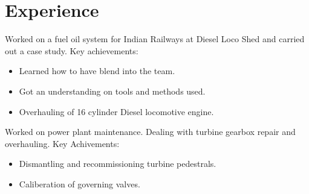 \section{Experience}

{Worked on a fuel oil system for Indian Railways at Diesel Loco Shed and carried out a case study.
\newline{}\newline{}
Key achievements:
\begin{itemize}
\item Learned how to have blend into the team.
\item Got an understanding on tools and methods used.
\item Overhauling of 16 cylinder Diesel locomotive engine.
\end{itemize}}

{Worked on power plant maintenance. Dealing with turbine gearbox repair and overhauling.
\newline{}\newline{}
Key Achivements: 
\begin{itemize}
\item Dismantling and recommissioning turbine pedestrals.
\item Caliberation of governing valves.
\end{itemize}  
}

